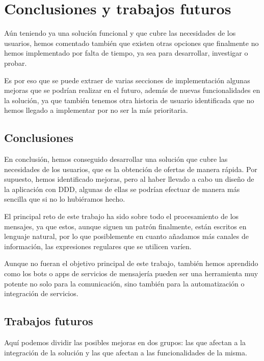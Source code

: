 \chapter{Conclusiones y trabajos futuros}

Aún teniendo ya una solución funcional y que cubre las necesidades de los usuarios, 
hemos comentado también que existen otras opciones que finalmente no hemos 
implementado por falta de tiempo, ya sea para desarrollar, investigar o probar.

Es por eso que se puede extraer de varias secciones de implementación algunas 
mejoras que se podrían realizar en el futuro, además de nuevas funcionalidades en 
la solución, ya que también tenemos otra historia de usuario identificada que no 
hemos llegado a implementar por no ser la más prioritaria.

\section{Conclusiones}

En conclusión, hemos conseguido desarrollar una solución que cubre las 
necesidades de los usuarios, que es la obtención de ofertas de manera rápida. Por 
supuesto, hemos identificado mejoras, pero al haber llevado a cabo un diseño de la 
aplicación con DDD, algunas de ellas se podrían efectuar de manera más sencilla que 
si no lo hubiéramos hecho.

El principal reto de este trabajo ha sido sobre todo el procesamiento de los 
mensajes, ya que estos, aunque siguen un patrón finalmente, están escritos en 
lenguaje natural, por lo que posiblemente en cuanto añadamos más canales de 
información, las expresiones regulares que se utilicen varíen.

Aunque no fueran el objetivo principal de este trabajo, también hemos aprendido 
como los bots o apps de servicios de mensajería pueden ser una herramienta muy 
potente no solo para la comunicación, sino también para la automatización o 
integración de servicios.

\section{Trabajos futuros}

Aquí podemos dividir las posibles mejoras en dos grupos: las que afectan a la 
integración de la solución y las que afectan a las funcionalidades de la misma.

